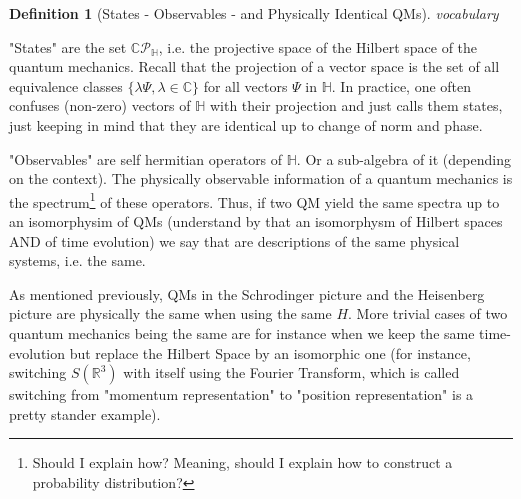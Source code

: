 \documentclass[a4paper,11pt]{article}
\numberwithin{equation}{section}
\theoremstyle{definition}
\newtheorem{definition}{Definition}
\begin{document}
\begin{definition}[States - Observables - and Physically Identical QMs] \emph{vocabulary}


"States" are the set $\mathbb{C}\mathcal{P}_\mathbb{H}$, i.e. the projective space of the Hilbert space of the quantum mechanics. Recall that the projection of a vector space is the set of all equivalence classes $\{\lambda \Psi, \lambda\in\mathbb{C}\}$ for all vectors $\Psi$ in $\mathbb{H}$. In practice, one often confuses (non-zero) vectors of $\mathbb{H}$ with their projection and just calls them states, just keeping in mind that they are identical up to change of norm and phase.

"Observables" are self hermitian operators of $\mathbb{H}$. Or a sub-algebra of it (depending on the context). The physically observable information of a quantum mechanics is the spectrum\footnote{\color{red}Should I explain how? Meaning, should I explain how to construct a probability distribution?\color{black}} of these operators. Thus, if two QM yield the same spectra up to an isomorphysim of QMs (understand by that an isomorphysm of Hilbert spaces AND of time evolution) we say that are descriptions of the same physical systems, i.e. the same.

As mentioned previously, QMs in the Schrodinger picture and the Heisenberg picture are physically the same when using the same $H$. More trivial cases of two quantum mechanics being the same are for instance when we keep the same time-evolution but replace the Hilbert Space by an isomorphic one (for instance, switching $S(\mathbb{R}^3)$ with itself using the Fourier Transform, which is called switching from "momentum representation" to "position representation" is a pretty stander example).    
\end{definition}
\end{document}
